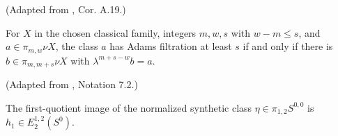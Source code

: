 \begin{theorem}
\label{frontier:Literature:436802be2502}
(Adapted from \cite{BHS}, Cor. A.19.)\par{}

For $X$ in the chosen classical family, integers $m,w,s$ with $w-m\le s$, and $a\in\pi_{m,w}\nu X$, the class $a$ has Adams filtration at least $s$ if and only if there is $b\in\pi_{m,m+s}\nu X$ with $\lambda^{m+s-w}b=a$.
\end{theorem}

\begin{theorem}
\label{frontier:Literature:48d4b249a919}
(Adapted from \cite{LWX126}, Notation 7.2.)\par{}

The first-quotient image of the normalized synthetic class $\eta\in\pi_{1,2}S^{0,0}$ is $h_1\in E_2^{1,2}(S^0)$.
\end{theorem}

